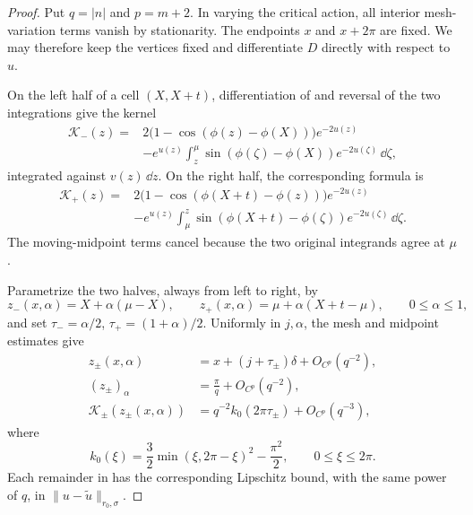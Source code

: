 \begin{proof}
Put \(q=|n|\) and \(p=m+2\).  In varying the critical action, all interior
mesh-variation terms vanish by stationarity.  The endpoints \(x\)
and \(x+2\pi\) are fixed.  We may therefore keep the vertices fixed
and differentiate \(D\) directly with respect to \(u\).

On the left half of a cell \((X,X+t)\), differentiation of
 and reversal of the two integrations give
the kernel
\begin{equation}\label{ana:variation-kernel}
\begin{split}
\mathcal K_-(z)={}&
2\bigl(1-\cos(\phi(z)-\phi(X))\bigr)e^{-2u(z)}\\
&-e^{u(z)}
\int_z^\mu\sin(\phi(\zeta)-\phi(X))e^{-2u(\zeta)}\,\dd\zeta ,
\end{split}
\end{equation}
integrated against \(v(z)\,\dd z\).
On the right half, the corresponding formula is
\[
\begin{split}
\mathcal K_+(z)={}&
2\bigl(1-\cos(\phi(X+t)-\phi(z))\bigr)e^{-2u(z)}\\
&-e^{u(z)}
\int_\mu^z\sin(\phi(X+t)-\phi(\zeta))
                  e^{-2u(\zeta)}\,\dd\zeta .
\end{split}
\]
The moving-midpoint terms cancel because the two original integrands
agree at \(\mu\).

Parametrize the two halves, always from left to right, by
\[
z_-(x,\alpha)=X+\alpha(\mu-X),\qquad
z_+(x,\alpha)=\mu+\alpha(X+t-\mu),\qquad 0\le\alpha\le1,
\]
and set
\(\tau_-=\alpha/2\), \(\tau_+=(1+\alpha)/2\).
Uniformly in \(j,\alpha\), the mesh and midpoint estimates give
\begin{equation}\label{ana:half-cell-estimates}
\begin{split}
z_\pm(x,\alpha)
 &=x+(j+\tau_\pm)\delta+O_{C^p}(q^{-2}),\\
(z_\pm)_\alpha&=\frac{\pi}{q}+O_{C^p}(q^{-2}),\\
\mathcal K_\pm(z_\pm(x,\alpha))
 &=q^{-2}k_0(2\pi\tau_\pm)+O_{C^p}(q^{-3}),
\end{split}
\end{equation}
where
\begin{equation}\label{ana:leading-kernel}
k_0(\xi)=\frac32\min(\xi,2\pi-\xi)^2-\frac{\pi^2}{2},
\qquad 0\le\xi\le2\pi.
\end{equation}
Each remainder in  has the corresponding
Lipschitz bound, with the same power of \(q\), in
\(\|u-\widetilde u\|_{r_0,\sigma}\).


\end{proof}
